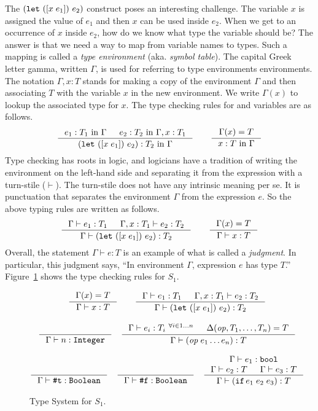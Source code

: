 \documentclass[12pt]{book}
\begin{document}
The $(\texttt{let}~([x\;e_1])~e_2)$ construct poses an interesting challenge. The
variable $x$ is assigned the value of $e_1$ and then $x$ can be used
inside $e_2$. When we get to an occurrence of $x$ inside $e_2$, how do
we know what type the variable should be?  The answer is that we need
a way to map from variable names to types.  Such a mapping is called a
\emph{type environment} (aka. \emph{symbol table}). The capital Greek
letter gamma, written $\Gamma$, is used for referring to type
environments environments. The notation $\Gamma, x : T$ stands for
making a copy of the environment $\Gamma$ and then associating $T$
with the variable $x$ in the new environment.  We write $\Gamma(x)$ to
lookup the associated type for $x$.  The type checking rules for
 and variables are as follows.
\begin{equation*}
  \inference{e_1 : T_1 \text{ in } \Gamma &
             e_2 : T_2 \text{ in } \Gamma,x:T_1}
            {\LET{x}{e_1}{e_2} : T_2 \text{ in } \Gamma} 
  \qquad
  \inference{\Gamma(x) = T}
            {x : T \text{ in } \Gamma}
\end{equation*}
Type checking has roots in logic, and logicians have a tradition of
writing the environment on the left-hand side and separating it from
the expression with a turn-stile ($\vdash$).  The turn-stile does not
have any intrinsic meaning per se.  It is punctuation that separates
the environment $\Gamma$ from the expression $e$.  So the above typing
rules are written as follows.
\begin{equation*}
  \inference{\Gamma \vdash e_1 : T_1 &
             \Gamma,x:T_1 \vdash e_2 : T_2}
            {\Gamma \vdash \LET{x}{e_1}{e_2} : T_2} 
   \qquad
  \inference{\Gamma(x) = T}
            {\Gamma \vdash x : T}
\end{equation*}
Overall, the statement $\Gamma \vdash e : T$ is an example of what is
called a \emph{judgment}.  In particular, this judgment says, ``In
environment $\Gamma$, expression $e$ has type $T$.''
Figure~\ref{fig:S1-type-system} shows the type checking rules for
$S_1$.

\begin{figure}
\begin{gather*}
  \inference{\Gamma(x) = T}
            {\Gamma \vdash x : T}
   \qquad
  \inference{\Gamma \vdash e_1 : T_1 &
             \Gamma,x:T_1 \vdash e_2 : T_2}
            {\Gamma \vdash \LET{x}{e_1}{e_2} : T_2} 
  \\[2ex]
  \inference{}{\Gamma \vdash n : \key{Integer}}
  \quad
  \inference{\Gamma \vdash e_i : T_i \ ^{\forall i \in 1\ldots n} & \Delta(\Op,T_1,\ldots,T_n) = T}
            {\Gamma \vdash (\Op \; e_1 \ldots e_n) : T}
  \\[2ex]
  \inference{}{\Gamma \vdash \key{\#t} : \key{Boolean}}
  \quad
  \inference{}{\Gamma \vdash \key{\#f} : \key{Boolean}}
  \quad
  \inference{\Gamma \vdash e_1 : \key{bool} \\
             \Gamma \vdash e_2 : T &
             \Gamma \vdash e_3 : T}
  {\Gamma \vdash \IF{e_1}{e_2}{e_3} : T}
\end{gather*}
\caption{Type System for $S_1$.}
\label{fig:S1-type-system}
\end{figure}
\end{document}
